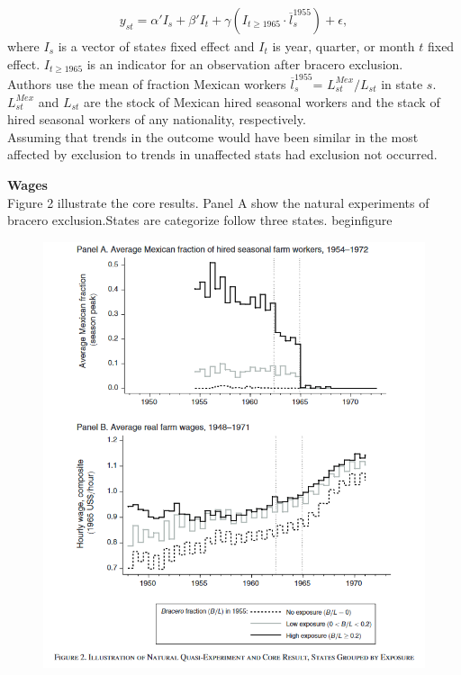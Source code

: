 \documentclass[../root]{subfiles}
\begin{document}
    \begin{align}
        y_{st}= \alpha' I_s + \beta'I_t +\gamma(I_{t \geq 1965} \cdot \overline{l}^{1955}_s) +\epsilon,
    \end{align}
    where $I_s$ is a vector of state$s$ fixed effect and $I_t$ is year, quarter, or month $t$ fixed effect. $I_{t \geq 1965}$ is an indicator for an observation after bracero exclusion. \\
    Authors use the mean of fraction Mexican workers $\overline{l}^{1955}_s$= $L^{Mex}_{st}/ L_{st}$ in state $s$. $L^{Mex}_{st}$ and $ L_{st}$ are the stock of Mexican hired seasonal workers and the stack of hired seasonal workers of any nationality, respectively. \\
    Assuming that trends in the outcome would have been similar in the most affected by exclusion to trends in unaffected stats had exclusion not occurred.

    {\bf Wages} \\
    Figure 2 illustrate the core results. Panel A show the natural experiments of bracero exclusion.States are categorize follow three states.
    begin{figure}
    \begin{figure}
        \centering
        \includegraphics[width = \linewidth]{0731sugiyama/Figure2.png}
        \label{fig:my_label}
    \end{figure}
    
\end{document}
